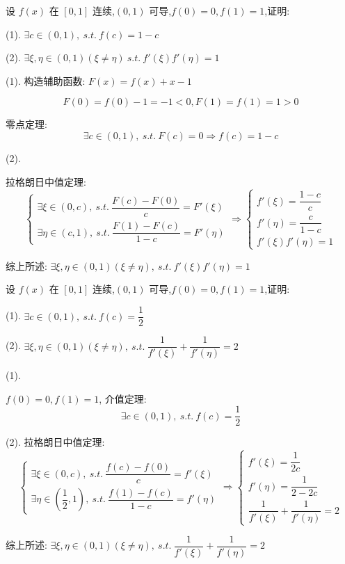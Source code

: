 \begin{proposition}
	设 $f(x)$ 在 $[0,1]$ 连续,$(0,1)$ 可导,$f(0)=0,f(1)=1$,证明:

	(1). $\exists c\in(0,1),\ s.t.\ f(c)=1-c$

	(2). $\exists \xi,\eta\in(0,1)(\xi\neq \eta)\ s.t.\ f'(\xi)f'(\eta)=1$
\end{proposition}
\begin{solution}

	(1). 构造辅助函数: $F(x)=f(x)+x-1$

	$$F(0)=f(0)-1=-1<0, F(1)= f(1) = 1 > 0$$

	零点定理:
	$$\exists c\in(0,1),\ s.t.\ F(c)=0\Rightarrow f(c)=1-c$$

	(2). 
	
	拉格朗日中值定理:
	$$\begin{cases}
		\exists \xi\in(0,c),\ s.t.\ \dfrac{F(c)-F(0)}{c}=F'(\xi)\\
		\exists \eta\in(c,1),\ s.t.\ \dfrac{F(1)-F(c)}{1-c}=F'(\eta)
	\end{cases}\Rightarrow
	\begin{cases}
		f'(\xi) = \dfrac{1-c}{c}\\
		f'(\eta) = \dfrac{c}{1-c}\\
		f'(\xi)f'(\eta) = 1
	\end{cases}$$

	综上所述: $\exists \xi,\eta\in(0,1)(\xi\neq \eta),\ s.t.\ f'(\xi)f'(\eta)=1$
\end{solution}

\begin{proposition}
	设 $f(x)$ 在 $[0,1]$ 连续,$(0,1)$ 可导,$f(0)=0,f(1)=1$,证明:

	(1). $\exists c\in(0,1),\ s.t.\ f(c)=\dfrac{1}{2}$

	(2). $\exists \xi,\eta\in(0,1)(\xi\neq \eta),\ s.t.\ \dfrac{1}{f'(\xi)}+\dfrac{1}{f'(\eta)}=2$
\end{proposition}
\begin{solution}

	(1). 
	
	$f(0)=0,f(1)=1$, 介值定理:
	$$\exists c\in(0,1),\ s.t.\ f(c)=\dfrac{1}{2}$$

	(2). 拉格朗日中值定理:
	$$\begin{cases}
		\exists \xi\in(0,c),\ s.t.\ \dfrac{f(c)-f(0)}{c}=f'(\xi)\\
		\exists \eta\in(\dfrac{1}{2},1),\ s.t.\ \dfrac{f(1)-f(c)}{1-c}=f'(\eta)
	\end{cases}\Rightarrow
	\begin{cases}
		f'(\xi) = \dfrac{1}{2c}\\
		f'(\eta) = \dfrac{1}{2-2c}\\
		\dfrac{1}{f'(\xi)}+\dfrac{1}{f'(\eta)} = 2
	\end{cases}$$

	综上所述: $\exists \xi,\eta\in(0,1)(\xi\neq \eta),\ s.t.\ \dfrac{1}{f'(\xi)}+\dfrac{1}{f'(\eta)}=2$
\end{solution}

